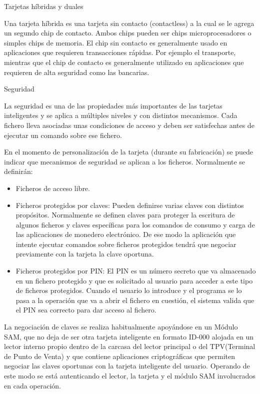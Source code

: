 \bigskip
Tarjetas híbridas y duales

\bigskip
Una tarjeta híbrida es una tarjeta sin contacto (contactless) a la cual se le agrega un segundo chip de contacto. Ambos chips pueden ser chips microprocesadores o simples chips de memoria. El chip sin contacto es generalmente usado en aplicaciones que requieren transacciones rápidas. Por ejemplo el transporte, mientras que el chip de contacto es generalmente utilizado en aplicaciones que requieren de alta seguridad como las bancarias.


\bigskip
Seguridad

La seguridad es una de las propiedades más importantes de las tarjetas inteligentes y se aplica a múltiples niveles y con distintos mecanismos. Cada fichero lleva asociadas unas condiciones de acceso y deben ser satisfechas antes de ejecutar un comando sobre ese fichero.

\bigskip
En el momento de personalización de la tarjeta (durante su fabricación) se puede indicar que mecanismos de seguridad se aplican a los ficheros. Normalmente se definirán:

\begin{itemize}
\item Ficheros de acceso libre.
\item Ficheros protegidos por claves: Pueden definirse varias claves con distintos propósitos. Normalmente se definen claves para proteger la escritura de algunos ficheros y claves específicas para los comandos de consumo y carga de las aplicaciones de monedero electrónico. De ese modo la aplicación que intente ejecutar comandos sobre ficheros protegidos tendrá que negociar previamente con la tarjeta la clave oportuna. 
\item Ficheros protegidos por PIN: El PIN es un número secreto que va almacenado en un fichero protegido y que es solicitado al usuario para acceder a este tipo de ficheros protegidos. Cuando el usuario lo introduce y el programa se lo pasa a la operación que va a abrir el fichero en cuestión, el sistema valida que el PIN sea correcto para dar acceso al fichero. 
\end{itemize}

La negociación de claves se realiza habitualmente apoyándose en un Módulo SAM, que no deja de ser otra tarjeta inteligente en formato ID-000 alojada en un lector interno propio dentro de la carcasa del lector principal o del TPV(Terminal de Punto de Venta) y que contiene aplicaciones criptográficas que permiten negociar las claves oportunas con la tarjeta inteligente del usuario. Operando de este modo se está autenticando el lector, la tarjeta y el módulo SAM involucrados en cada operación.


